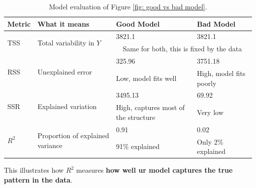 \begin{table}[!htp]
    \centering
    \begin{adjustbox}{width={\textwidth},totalheight={\textheight},keepaspectratio}
    \begin{tabular}{@{} l l p{10em} l @{}}
        \toprule
        \textbf{Metric} & \textbf{What it means} & \textbf{Good Model} & \textbf{Bad Model} \\
        \midrule
        \multirow{2}{*}{TSS}        & \multirow{2}{*}{Total variability in $Y$} & 3821.1 & 3821.1 \\ [.3em]
                                    &  & \multicolumn{2}{c}{Same for both, this is fixed by the data} \\
        \cmidrule{1-4}
        \multirow{2}{*}{RSS}        & \multirow{2}{*}{Unexplained error} & 325.96 & 3751.18 \\ [.3em]
                                    &  & Low, model fits well & High, model fits poorly \\
        \cmidrule{1-4}
        \multirow{2}{*}{SSR}        & \multirow{2}{*}{Explained variation} & 3495.13 & 69.92 \\ [.3em]
                                    &  & High, captures most of the structure & Very low \\
        \cmidrule{1-4}
        \multirow{2}{*}{$R^{2}$}    & \multirow{2}{*}{Proportion of explained variance} & 0.91 & 0.02 \\ [.3em]
                                    &  & 91\% explained & Only 2\% explained \\
        \bottomrule
    \end{tabular}
    \end{adjustbox}
    \caption{Model evaluation of Figure \ref{fig: good vs bad model}.}
\end{table}

\noindent
This illustrates how $R^{2}$ measures \textbf{how well ur model captures the true pattern in the data}.